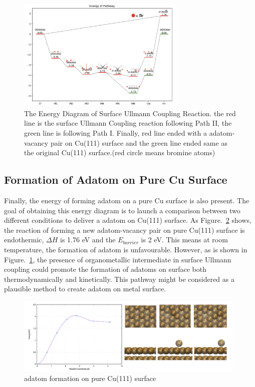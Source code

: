 \documentclass[aps,reprint,amsmath,amssymb]{revtex4-2}
\begin{document}
\begin{figure}[ht]
\centering
\includegraphics[width=0.72\textwidth]{Fig/completeenergy.png}
\caption{The Energy Diagram of Surface Ullmann Coupling Reaction.
the red line is the surface Ullmann Coupling reaction following Path II, the green line is following Path I. Finally, red line ended with a adatom-vacancy pair on Cu(111) surface and the green line ended same as the original Cu(111) surface.(red circle means bromine atoms)}
\label{fig:completeenergy}
\end{figure}

\subsection{Formation of Adatom on Pure Cu Surface}

Finally, the energy of forming adatom on a pure Cu surface is also present. The goal of obtaining this energy diagram is to launch a comparison between two different conditions to deliver a adatom on Cu(111) surface. 
As Figure.~\ref{fig:pureadatomform} shows, the reaction of forming a new adatom-vacancy pair on pure Cu(111) surface is endothermic, $\Delta H$ is 1.76 eV and the $E_{barrier}$ is 2 eV. This means at room temperature, the formation of adatom is unfavourable. 
However, as is shown in Figure.~\ref{fig:completeenergy}, the presence of organometallic intermediate in surface Ullmann coupling could promote the formation of adatoms on surface both thermodynamically and kinetically. This pathway might be considered as a plausible method to create adatom on metal surface.

\begin{figure}[ht]
\centering
\includegraphics[width=0.98\textwidth]{Fig/pureadatomform.png}
\caption{adatom formation on pure Cu(111) surface}
\label{fig:pureadatomform}
\end{figure}



  
\end{document}
